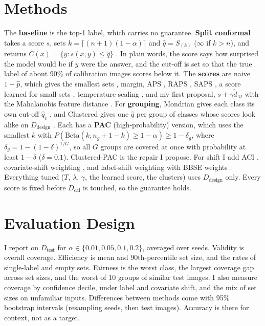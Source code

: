 \documentclass{article}
\begin{document}
\section{Methods}
The \textbf{baseline} is the top-1 label, which carries no guarantee. \textbf{Split conformal} takes a score $s$, sets
$k=\lceil(n+1)(1-\alpha)\rceil$ and $\hat q=S_{(k)}$ ($\infty$ if $k>n$), and returns $C(x)=\{y:s(x,y)\le\hat q\}$
\citep{vovk2005algorithmic,lei2018distribution}. In plain words, the score says how surprised the model would be if $y$ were
the answer, and the cut-off is set so that the true label of about 90\% of calibration images scores below it. The \textbf{scores} are naive $1-\hat p$, which gives the smallest sets
\citep{sadinle2019least}, margin, APS \citep{romano2020classification}, RAPS \citep{angelopoulos2021uncertainty}, SAPS
\citep{huang2024saps}, a score learned for small sets \citep{stutz2022learning}, temperature scaling \citep{guo2017calibration}, and my
first proposal, $s+\gamma\tilde d_M$ with the Mahalanobis feature distance \citep{lee2018simple}. For \textbf{grouping}, Mondrian gives
each class its own cut-off $\hat q_c$ \citep{vovk2012conditional}, and Clustered gives one $\hat q$ per group of classes whose
scores look alike on $D_\text{design}$ \citep{ding2023class}. Each has a \textbf{PAC} (high-probability) version, which uses the smallest $k$ with
$P(\mathrm{Beta}(k,n_g{+}1{-}k)\ge1-\alpha)\ge1-\delta_g$, where $\delta_g=1-(1-\delta)^{1/G}$, so all $G$ groups are covered at once
with probability at least $1-\delta$ ($\delta=0.1$). Clustered-PAC is the repair I propose. For shift I add ACI
\citep{gibbs2021adaptive}, covariate-shift weighting \citep{tibshirani2019conformal}, and label-shift weighting with BBSE weights
\citep{podkopaev2021distribution,lipton2018detecting}. Everything tuned ($T$, $\lambda$, $\gamma$, the learned score, the clusters)
uses $D_\text{design}$ only. Every score is fixed before $D_\text{cal}$ is touched, so the guarantee holds.

\section{Evaluation Design}
I report on $D_\text{test}$ for $\alpha\in\{0.01,0.05,0.1,0.2\}$, averaged over seeds. Validity is overall coverage. Efficiency is
mean and 90th-percentile set size, and the rates of single-label and empty sets. Fairness is the worst class, the largest coverage
gap across set sizes, and the worst of 10 groups of similar test images. I also measure coverage by confidence decile, under label and
covariate shift, and the mix of set sizes on unfamiliar inputs. Differences between methods come with 95\% bootstrap intervals
(resampling seeds, then test images). Accuracy is there for context, not as a target.
\end{document}
